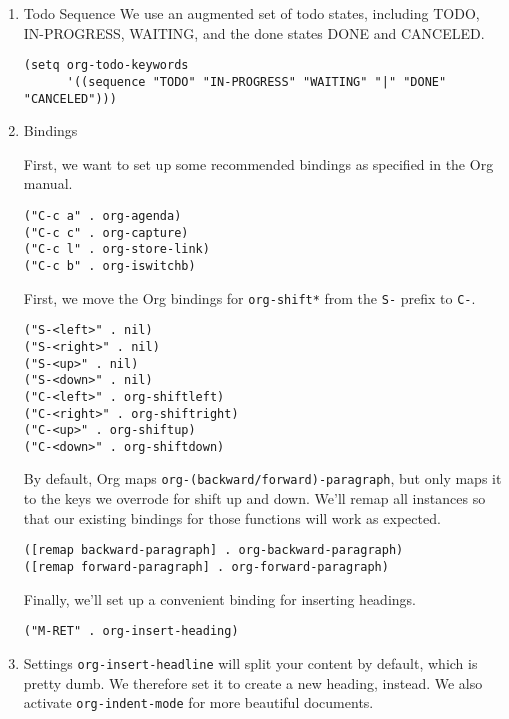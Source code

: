 \documentclass[11pt]{article}
\begin{document}
\begin{enumerate}
\begin{enumerate}
\begin{verbatim}
(add-hook 'org-mode-hook 'the-fix-easy-templates)
\end{verbatim}

\item Todo Sequence
\label{sec:orga481218}
We use an augmented set of todo states, including TODO, IN-PROGRESS,
WAITING, and the done states DONE and CANCELED.
\begin{verbatim}
(setq org-todo-keywords
      '((sequence "TODO" "IN-PROGRESS" "WAITING" "|" "DONE" "CANCELED")))
\end{verbatim}
\item Bindings
\label{sec:orgcb7de43}

First, we want to set up some recommended bindings as specified in the
Org manual.

\begin{verbatim}
("C-c a" . org-agenda)
("C-c c" . org-capture)
("C-c l" . org-store-link)
("C-c b" . org-iswitchb)
\end{verbatim}

First, we move the Org bindings for \texttt{org-shift*} from the \texttt{S-} prefix
to \texttt{C-}.

\begin{verbatim}
("S-<left>" . nil)
("S-<right>" . nil)
("S-<up>" . nil)
("S-<down>" . nil)
("C-<left>" . org-shiftleft)
("C-<right>" . org-shiftright)
("C-<up>" . org-shiftup)
("C-<down>" . org-shiftdown)
\end{verbatim}

By default, Org maps \texttt{org-(backward/forward)-paragraph}, but only maps
it to the keys we overrode for shift up and down. We'll remap all
instances so that our existing bindings for those functions will work
as expected.

\begin{verbatim}
([remap backward-paragraph] . org-backward-paragraph)
([remap forward-paragraph] . org-forward-paragraph)
\end{verbatim}

Finally, we'll set up a convenient binding for inserting headings.

\begin{verbatim}
("M-RET" . org-insert-heading)
\end{verbatim}

\item Settings
\label{sec:org3b4186b}
\texttt{org-insert-headline} will split your content by default, which is
pretty dumb. We therefore set it to create a new heading, instead. We
also activate \texttt{org-indent-mode} for more beautiful documents.


\end{enumerate}
\end{enumerate}
\end{document}
